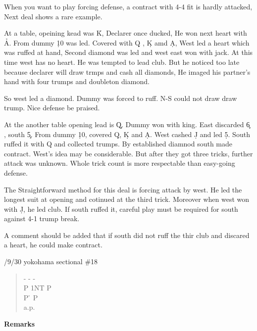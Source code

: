 When you want to play forcing defense, a contract with 4-4 fit
is hardly attacked, Next deal shows a rare example.

At a table, opeining kead was \h K, Declarer once ducked, He won
next heart with \h A. From dummy \d 10 was led. Covered with \d Q ,
\d K amd \d A, West led a heart which was ruffed at hand, Second 
diamond was led and west east won with jack. At this time west has no heart.
He was  tempted to lead club. But he noticed too late because 
declarer will draw trmps and cash all diamonds, He imaged his partner's
hand with four trumps and doubleton diamond.

So west led a diamond. Dummy was forced to ruff. N-S could not draw 
draw trump. Nice defense be praised.

At the another table opening lead is \c Q. Dummy won with king. East
discarded \c 6 , south \c 5. From dummy \d 10, covered \d Q, \d K and \d A.
West cashed \d J and led \d 5. South ruffed it with \s Q and collected trumps.
By established diamnod south made contract. West's idea may be
considerable. But after they got three tricks, further attack was unknown.
Whole trick count is more respectable than easy-going defense.

The Straightforward method for this deal is forcing attack by west.
He led the longest suit at opening and cotinued at the third trick.
Moreover when west won with \d J, he led club. If south ruffed it,
careful play must be required for south against 4-1 trump break.

A comment should be added  that if south did not ruff the thir club
and discared a heart, he could make contract.

\vspace{0.5cm}

/9/30 yokohama sectional \#18
\begin{quote}
%
  {}%
  {}
  {}%
  {}%
\end{quote}
\begin{quote}
\begin{bidding}
- \> -  \> - \s  \\
P \> 1NT \> P  \h \\
P \h \> P \h \\
a.p.
\end{bidding}
\end{quote}
{\bf Remarks}\\


